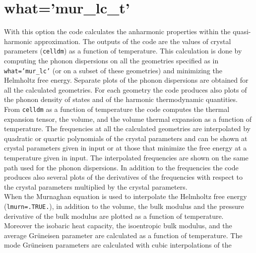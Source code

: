 \documentclass[12pt,a4paper,twoside]{report}
\begin{document}

\newpage
{\color{coral}\section{what='mur\_lc\_t'}}
\color{black}
With this option the code calculates the anharmonic 
properties within the quasi-harmonic approximation. 
The outputs of the code are the values of crystal parameters 
(\texttt{celldm}) as a function of temperature. This calculation is done 
by computing the phonon dispersions on all the geometries specified as in
\texttt{what='mur\_lc'} (or on a subset of these geometries) and 
minimizing the Helmholtz free energy.
Separate plots of the phonon dispersions are obtained for all the 
calculated geometries.
For each geometry the code produces also plots of the phonon density
of states and of the harmonic thermodynamic quantities.
From \texttt{celldm} as a function of temperature the code computes the thermal
expansion tensor, the volume, and the volume thermal expansion as a 
function of temperature. 
The frequencies at all the calculated geometries are interpolated
by quadratic or quartic polynomials of the crystal parameters
and can be shown at crystal parameters given in input or at those that
minimize the free energy at a temperature given in input. The 
interpolated frequencies  
are shown on the same path used for the phonon dispersions.
In addition to the frequencies the code produces also several plots of
the derivatives of the frequencies with respect to the crystal parameters
multiplied by the crystal parameters. \\
When the Murnaghan equation is used to interpolate the
Helmholtz free energy (\texttt{lmurn=.TRUE.}), in addition to the volume, 
the bulk modulus and the pressure derivative of the bulk modulus are 
plotted as a function of 
temperature. Moreover the isobaric heat capacity, the isoentropic 
bulk modulus, and the average Gr\"uneisen parameter are calculated as 
a function of temperature.
The mode Gr\"uneisen parameters are calculated with cubic interpolations of the
\end{document}
